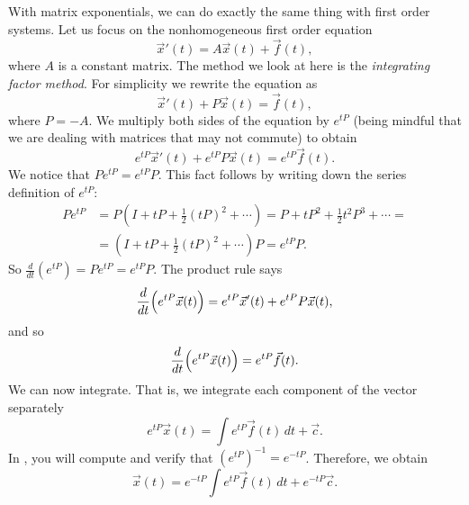 \documentclass{ximera}
\begin{document}
With matrix exponentials, we can do exactly the same thing with first order systems. Let us focus on the nonhomogeneous first order equation
\begin{equation*}
    {\vec{x}}'(t) = A\vec{x}(t) + \vec{f}(t) ,
\end{equation*}
where $A$ is a constant matrix.  The method we look at here is the \emph{integrating factor method}. For simplicity we rewrite the equation as
\begin{equation*}
    {\vec{x}}'(t) + P \vec{x}(t) = \vec{f}(t) ,
\end{equation*}
where $P = -A$. We multiply both sides of the equation by $e^{tP}$ (being mindful that we are dealing with matrices that may not commute) to obtain
\begin{equation*}
    e^{tP}{\vec{x}}'(t) + e^{tP}P\vec{x}(t) = e^{tP}\vec{f}(t) .
\end{equation*}
We notice that $P e^{tP} = e^{tP} P$.  This fact follows by writing down the series definition of $e^{tP}$:
\begin{equation*}
    \begin{split}
        P e^{tP} & = P \left( I + tP + \frac{1}{2} {(tP)}^2 + \cdots \right) = P + tP^2 + \frac{1}{2} t^2P^3 + \cdots = \\
        & = \left( I + tP + \frac{1}{2} {(tP)}^2 + \cdots \right) P = e^{tP} P . 
    \end{split}
\end{equation*}
So $\frac{d}{dt} \left( e^{tP} \right) = P e^{tP} = e^{tP} P$.  The product rule says
\begin{equation*}
    \frac{d}{dt} \Bigl( e^{tP} \vec{x}(t) \Bigr) = e^{tP}{\vec{x}}'(t) + e^{tP}P\vec{x}(t),
\end{equation*}
and so
\begin{equation*}
    \frac{d}{dt} \Bigl( e^{tP} \vec{x}(t) \Bigr) = e^{tP}\vec{f}(t) .
\end{equation*}
We can now integrate.  That is, we integrate each component of the vector separately
\begin{equation*}
    e^{tP} \vec{x}(t) = \int e^{tP}\vec{f}(t) \, dt + \vec{c} .
\end{equation*}
In , you will compute and verify that ${(e^{tP})}^{-1} = e^{-tP}$. Therefore, we obtain
\begin{equation*}
    \vec{x}(t) = e^{-tP} \int e^{tP}\vec{f}(t) \, dt + e^{-tP} \vec{c} .
\end{equation*}
\end{document}
